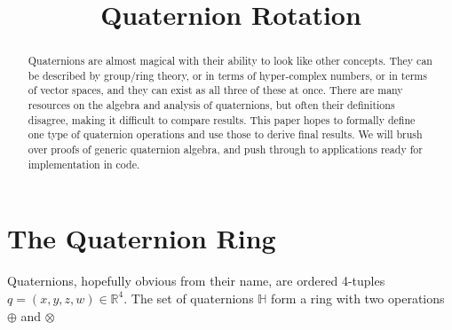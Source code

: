 \documentclass{amsart}
\theoremstyle{definition}
\theoremstyle{remark}
\numberwithin{equation}{section}
\begin{document}
\title{Quaternion Rotation}

\begin{abstract}
Quaternions are almost magical with their ability to look like other concepts. They can be described by group/ring theory, or in terms of hyper-complex numbers, or in terms of vector spaces, and they can exist as all three of these at once. There are many resources on the algebra and analysis of quaternions, but often their definitions disagree, making it difficult to compare results. This paper hopes to formally define one type of quaternion operations and use those to derive final results. We will brush over proofs of generic quaternion algebra, and push through to applications ready for implementation in code.
\end{abstract}

\maketitle

\section{The Quaternion Ring}
Quaternions, hopefully obvious from their name, are ordered 4-tuples $q=(x, y, z, w)\in\mathbb{R}^4$. The set of quaternions $\mathbb{H}$ form a ring with two operations $\oplus$ and $\otimes$
\end{document}
